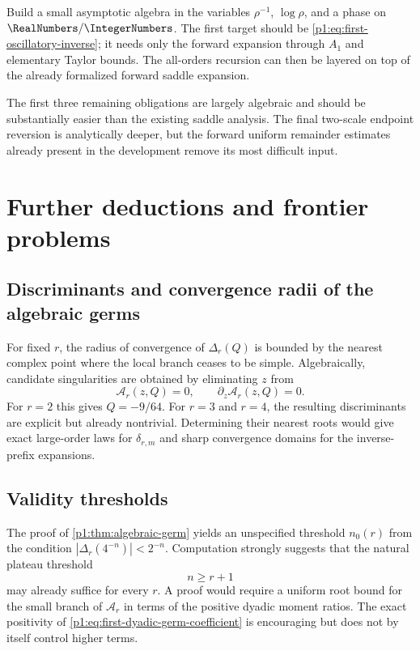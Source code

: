 \documentclass[11pt,oneside]{article}
\numberwithin{equation}{section}
\theoremstyle{definition}
\theoremstyle{remark}
\begin{document}
\begin{obligation}
Build a small asymptotic algebra in the variables $\rho^{-1}$, $\log\rho$, and a phase on
$\RealNumbers/\IntegerNumbers$.  The first target should be \eqref{p1:eq:first-oscillatory-inverse}; it needs only the
forward expansion through $A_1$ and elementary Taylor bounds.  The all-orders recursion can
then be layered on top of the already formalized forward saddle expansion.
\end{obligation}

The first three remaining obligations are largely algebraic and should be substantially easier
than the existing saddle analysis.  The final two-scale endpoint reversion is analytically
deeper, but the forward uniform remainder estimates already present in the development remove
its most difficult input.

\section{Further deductions and frontier problems}
\label{p1:sec:frontier-problems}

\subsection{Discriminants and convergence radii of the algebraic germs}

For fixed $r$, the radius of convergence of $\Delta_r(Q)$ is bounded by the nearest complex
point where the local branch ceases to be simple.  Algebraically, candidate singularities are
obtained by eliminating $z$ from
\begin{equation}
 \mathcal A_r(z,Q)=0,
 \qquad
 \partial_z\mathcal A_r(z,Q)=0.
 \label{p1:eq:discriminant-system}
\end{equation}
For $r=2$ this gives $Q=-9/64$.  For $r=3$ and $r=4$, the resulting discriminants are
explicit but already nontrivial.  Determining their nearest roots would give exact
large-order laws for $\delta_{r,m}$ and sharp convergence domains for the inverse-prefix
expansions.

\subsection{Validity thresholds}

The proof of \cref{p1:thm:algebraic-germ} yields an unspecified threshold $n_0(r)$ from the
condition $|\Delta_r(4^{-n})|<2^{-n}$.  Computation strongly suggests that the natural
plateau threshold
\begin{equation}
 n\ge r+1
 \label{p1:eq:natural-threshold-conjecture}
\end{equation}
may already suffice for every $r$.  A proof would require a uniform root bound for the small
branch of $\mathcal A_r$ in terms of the positive dyadic moment ratios.  The exact positivity
of \eqref{p1:eq:first-dyadic-germ-coefficient} is encouraging but does not by itself control
higher terms.
\end{document}
